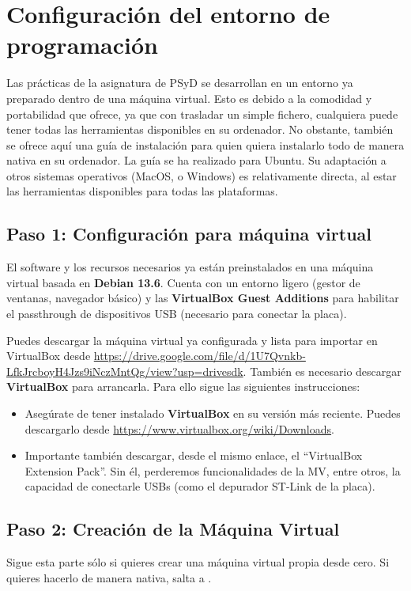 \documentclass[../main.tex]{subfiles}
\begin{document}
\section{Configuración del entorno de programación}

    Las prácticas de la asignatura de PSyD se desarrollan en un entorno ya preparado dentro de una máquina virtual. Esto es debido a la comodidad y portabilidad que ofrece, ya que con trasladar un simple fichero, cualquiera puede tener todas las herramientas disponibles en su ordenador. No obstante, también se ofrece aquí una guía de instalación para quien quiera instalarlo todo de manera nativa en su ordenador. La guía se ha realizado para Ubuntu. Su adaptación a otros sistemas operativos (MacOS, o Windows) es relativamente directa, al estar las herramientas disponibles para todas las plataformas. 

    \subsection{Paso 1: Configuración para máquina virtual}
        El software y los recursos necesarios ya están preinstalados en una máquina virtual basada en \textbf{Debian 13.6}. Cuenta con un entorno ligero (gestor de ventanas, navegador básico) y las \textbf{VirtualBox Guest Additions} para habilitar el passthrough de dispositivos USB (necesario para conectar la placa).

        Puedes descargar la máquina virtual ya configurada y lista para importar en VirtualBox desde \url{https://drive.google.com/file/d/1U7Qvnkb-LfkJrcboyH4Jzs9iNczMntQg/view?usp=drivesdk}. También es necesario descargar \textbf{VirtualBox} para arrancarla. Para ello sigue las siguientes instrucciones:

        \begin{itemize}
            \item Asegúrate de tener instalado \textbf{VirtualBox} en su versión más reciente. Puedes descargarlo desde \url{https://www.virtualbox.org/wiki/Downloads}.
            \item Importante también descargar, desde el mismo enlace, el ``VirtualBox Extension Pack''. Sin él, perderemos funcionalidades de la MV, entre otros, la capacidad de conectarle USBs (como el depurador ST-Link de la placa).
        \end{itemize}

    \subsection{Paso 2: Creación de la Máquina Virtual}
        Sigue esta parte sólo si quieres crear una máquina virtual propia desde cero. Si quieres hacerlo de manera nativa, salta a .
\end{document}
